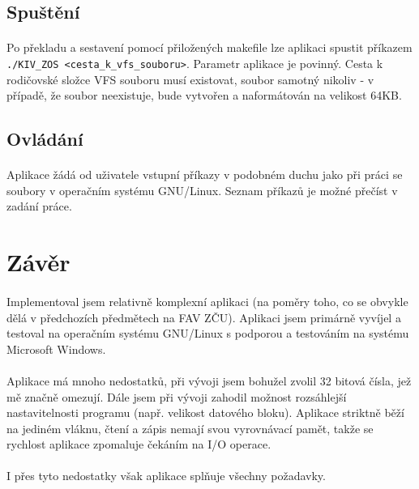 \documentclass[12pt, a4paper]{article}
\begin{document}
\subsection{Spuštění}
\paragraph{}
Po překladu a sestavení pomocí přiložených makefile lze aplikaci spustit příkazem \verb|./KIV_ZOS <cesta_k_vfs_souboru>|. Parametr aplikace je povinný. Cesta k rodičovské složce VFS souboru musí existovat, soubor samotný nikoliv - v případě, že soubor neexistuje, bude vytvořen a naformátován na velikost 64KB.

\subsection{Ovládání}
\paragraph{}
Aplikace žádá od uživatele vstupní příkazy v podobném duchu jako při práci se soubory v operačním systému GNU/Linux. Seznam příkazů je možné přečíst v zadání práce. 


\newpage
\section{Závěr}
\paragraph{}
Implementoval jsem relativně komplexní aplikaci (na poměry toho, co se obvykle dělá v předchozích předmětech na FAV ZČU). Aplikaci jsem primárně vyvíjel a testoval na operačním systému GNU/Linux s podporou a testováním na systému Microsoft Windows. 
\paragraph{}
Aplikace má mnoho nedostatků, při vývoji jsem bohužel zvolil 32 bitová čísla, jež mě značně omezují. Dále jsem při vývoji zahodil možnost rozsáhlejší nastavitelnosti programu (např. velikost datového bloku). Aplikace striktně běží na jediném vláknu, čtení a zápis nemají svou vyrovnávací pamět, takže se rychlost aplikace zpomaluje čekáním na I/O operace.
\paragraph{}
I přes tyto nedostatky však aplikace splňuje všechny požadavky. 
\end{document}
